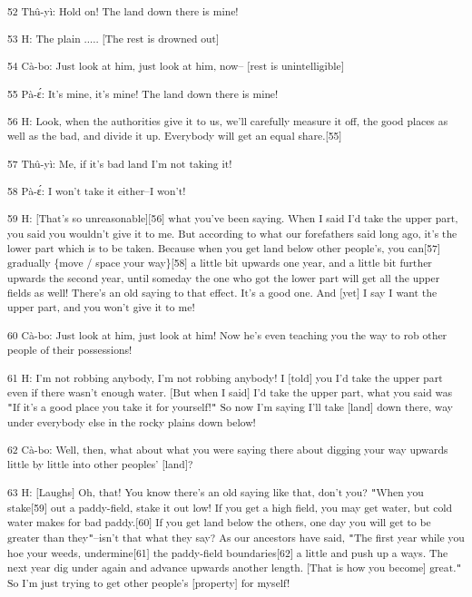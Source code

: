 \leftskip=0pt
{\textsuperscript{52 Thû-yì: Hold on! The land down there is mine!}}

{\textsuperscript{53 H: The plain ..... [The rest is drowned out]}}

{\textsuperscript{54 Cà-bo: Just look at him, just look at him, now-- [rest
is unintelligible]}}

{\textsuperscript{55 Pà-ɛ́: It's mine, it's mine! The land down there
is mine! }}

{\textsuperscript{56 H: Look, when the authorities give it to us, we'll
carefully measure it off, the good places as well as the bad, and divide it up.
Everybody will get an equal share.[55]}}

{\textsuperscript{57 Thû-yì: Me, if it's bad land I'm not taking it!}}

{\textsuperscript{58 Pà-ɛ́: I won't take it either--I won't!}}

{\textsuperscript{59 H: [That's so unreasonable][56] what you've been saying.
When I said I'd take the upper part, you said you wouldn't give it to me. But according
to what our forefathers said long ago, it's the lower part which is to be taken.
Because when you get land below other people's, you can[57] gradually \{move /
space your way\}[58] a little bit upwards one year, and a little bit further upwards
the second year, until someday the one who got the lower part will get all the
upper fields as well! There's an old saying to that effect. It's a good one. And
[yet] I say I want the upper part, and you won't give it to me!}}

{\textsuperscript{60 Cà-bo: Just look at him, just look at him! Now he's
even teaching you the way to rob other people of their possessions!}}

{\textsuperscript{61 H: I'm not robbing anybody, I'm not robbing anybody!
I [told] you I'd take the upper part even if there wasn't enough water. [But when
I said] I'd take the upper part, what you said was \texttt{"}If it's a good place
you take it for yourself!\texttt{"} So now I'm saying I'll take [land] down there,
way under everybody else in the rocky plains down below! }}

{\textsuperscript{62 Cà-bo: Well, then, what about what you were saying
there about digging your way upwards little by little into other peoples' [land]?}}

{\textsuperscript{63 H: [Laughs] Oh, that! You know there's an old saying
like that, don't you? \texttt{"}When you stake[59] out a paddy-field, stake it
out low! If you get a high field, you may get water, but cold water makes for bad
paddy.[60] If you get land below the others, one day you will get to be greater
than they\texttt{"}--isn't that what they say? As our ancestors have said, \texttt{"}The
first year while you hoe your weeds, undermine[61] the paddy-field boundaries[62]
a little and push up a ways. The next year dig under again and advance upwards
another length. [That is how you become] great.\texttt{"} So I'm just trying to
get other people's [property] for myself! }}

